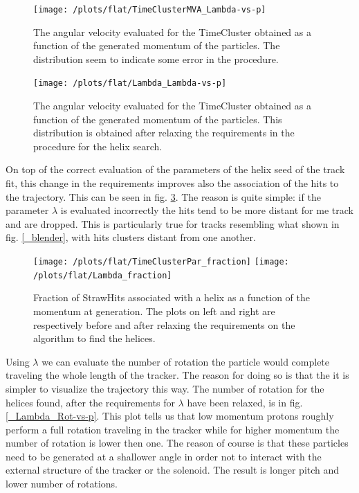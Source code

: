 \documentclass[12pt,a4paper,openright, oneside, titlepage]{book} %
\begin{document}
\begin{figure}[h!]
\centering
\texttt{[image: /plots/flat/TimeClusterMVA\_Lambda-vs-p]}
\caption{The angular velocity evaluated for the TimeCluster obtained as a function of the generated momentum of the particles. The distribution seem to indicate some error in the procedure.}
\label{_TimeClusterMVA_Lambda-vs-p}
\end{figure}

\begin{figure}[h!]
\centering
\texttt{[image: /plots/flat/Lambda\_Lambda-vs-p]}
\caption{The angular velocity evaluated for the TimeCluster obtained as a function of the generated momentum of the particles. This distribution is obtained after relaxing the requirements in the procedure for the helix search.}
\label{_Lambda_Lambda-vs-p}
\end{figure}

\noindent On top of the correct evaluation of the parameters of the helix seed of the track fit, this change in the requirements improves also the association of the hits to the trajectory. This can be seen in fig. \ref{_active_SH_fraction}. 
The reason is quite simple: if the parameter $\lambda$ is evaluated incorrectly the hits tend to be more distant for me track and are dropped. This is particularly true for tracks resembling what shown in fig. \ref{_blender}, with hits clusters distant from one another. \\

\begin{figure}[h!]
\centering
\texttt{[image: /plots/flat/TimeClusterPar\_fraction]}\hfill
\texttt{[image: /plots/flat/Lambda\_fraction]}
\caption{Fraction of StrawHits associated with a helix as a function of the momentum at generation. The plots on left and right are respectively before and after relaxing the requirements on the algorithm to find the helices.}
\label{_active_SH_fraction}
\end{figure}

\noindent Using $\lambda$ we can evaluate the number of rotation the particle would complete traveling the whole length of the tracker. 
The reason for doing so is that the it is simpler to visualize the trajectory this way. 
The number of rotation for the helices found, after the requirements for $\lambda$ have been relaxed, is in fig. \ref{_Lambda_Rot-vs-p}. 
This plot tells us that low momentum protons roughly perform a full rotation traveling in the tracker while for higher momentum the number of rotation is lower then one. 
The reason of course is that these particles need to be generated at a shallower angle in order not to interact with the external structure of the tracker or the solenoid. The result is longer pitch and lower number of rotations.\\
\end{document}
